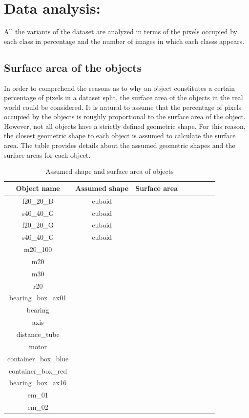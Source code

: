 \section{Data analysis:}
	All the variants of the dataset are analyzed in terms of the pixels occupied by each class in percentage and the number of images in which each classs appears.
	
	\subsection{Surface area of the objects}
		
		In order to comprehend the reasons as to why an object constitutes a certain percentage of pixels in a dataset split, the surface area of the objects in the real world could be considered. It is natural to assume that the percentage of pixels occupied by the objects is roughly proportional to the surface area of the object. However, not all objects have a strictly defined geometric shape. For this reason, the closest geometric shape to each object is assumed to calculate the surface area. The table provides details about the assumed geometric shapes and the surface areas for each object.
		
		\begin{table}[!htb]
			\centering
			\begin{tabular}{|c|c|c|c|c|c|c|c|}
			\hline 
  			\textbf{Object name} & \textbf{Assumed shape} & \textbf{Surface area} \\ 
			\hline
  			 f20\_20\_B & cuboid &  \\ 
			\hline
  			 s40\_40\_G & cuboid &  \\ 
			\hline
  			 f20\_20\_G & cuboid &  \\ 
			\hline
  			 s40\_40\_G & cuboid &  \\ 
			\hline
  			 m20\_100 &  &  \\ 
			\hline
  			 m20 &  &  \\ 
			\hline
  			 m30 &  &  \\ 
			\hline
  			 r20 &  &  \\ 
			\hline
  			 bearing\_box\_ax01 &  &  \\ 
			\hline
  			 bearing &  &  \\ 
			\hline
  			 axis &  &  \\ 
			\hline
  			 distance\_tube &  &  \\ 
			\hline
  			 motor &  &  \\ 
			\hline
  			 container\_box\_blue &  &  \\ 
			\hline
  			 container\_box\_red &  &  \\ 
			\hline
  			 bearing\_box\_ax16 &  &  \\ 
			\hline
  			 em\_01 &  &  \\ 
			\hline
  			 em\_02 &  &  \\ 
			\hline
			\end{tabular}
			\caption{Assumed shape and surface area of objects} 
			\label{Table:surface}
		\end{table}
		
